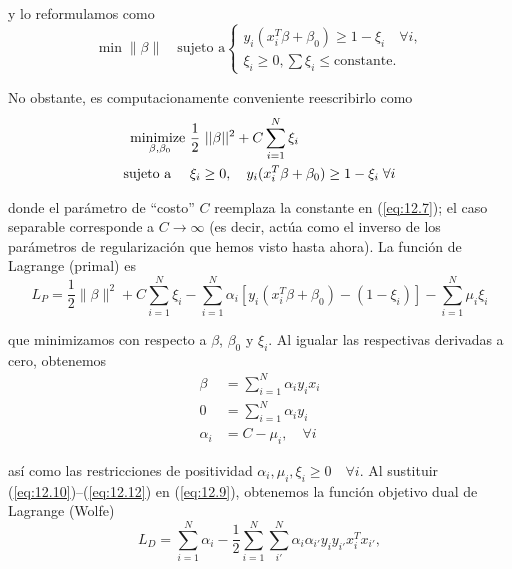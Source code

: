 \noindent y lo reformulamos como 
\begin{equation}
\min \|\beta\| \quad \text{sujeto a}
\begin{cases}
y_i (x_i^T \beta + \beta_0) \geq 1 - \xi_i \quad \forall i, \\
\xi_i \geq 0, \sum \xi_i \leq \text{constante}.
\end{cases}
\label{eq:12.7}
\end{equation}

\noindent No obstante, es computacionamente conveniente reescribirlo como 
\begin{align}
\underset{\beta, \beta_0}{\text{minimize }} & \frac{1}{2} ||\beta||^2 + C\sum_{i = 1}^N \xi_i \notag \\
\text{sujeto a } \quad & \xi_i \geq 0, \quad y_i(x_i^T \beta + \beta_0) \geq 1 - \xi_i \; \forall i \label{eq:12.8} \\
\end{align}

donde el parámetro de ``costo'' $C$ reemplaza la constante en (\ref{eq:12.7}); el caso separable corresponde a $C \to \infty$ (es decir, actúa como el inverso de los parámetros de regularización que hemos visto hasta ahora). La función de Lagrange (primal) es
\begin{equation}
L_P = \frac{1}{2} \|\beta\|^2 + C \sum_{i=1}^N \xi_i - \sum_{i=1}^N \alpha_i [y_i (x_i^T \beta + \beta_0) - (1 - \xi_i)] - \sum_{i=1}^N \mu_i \xi_i
\label{eq:12.9}
\end{equation}

que minimizamos con respecto a $\beta$, $\beta_0$ y $\xi_i$. Al igualar las respectivas derivadas a cero, obtenemos
\begin{align}
\beta &= \sum_{i=1}^N \alpha_i y_i x_i \label{eq:12.10} \\
0 &= \sum_{i=1}^N \alpha_i y_i \label{eq:12.11} \\
\alpha_i &= C - \mu_i, \quad \forall i \label{eq:12.12}
\end{align}

así como las restricciones de positividad $\alpha_i, \mu_i, \xi_i \geq 0 \quad \forall i$. Al sustituir (\ref{eq:12.10})–(\ref{eq:12.12}) en (\ref{eq:12.9}), obtenemos la función objetivo dual de Lagrange (Wolfe)
\begin{equation}
L_D = \sum_{i=1}^N \alpha_i - \frac{1}{2} \sum_{i=1}^N \sum_{i'}^N \alpha_i \alpha_{i'} y_i y_{i'} x_i^T x_{i'},
\label{eq:12.13}
\end{equation}

